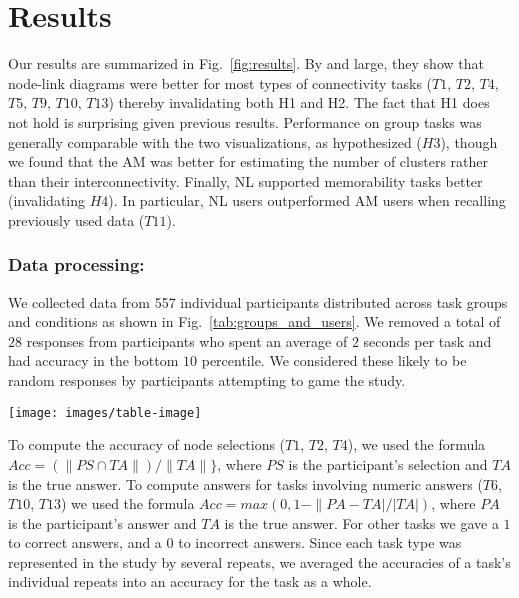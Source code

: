 \section{Results}

Our results are summarized in Fig.~\ref{fig:results}. By and large, they show that node-link diagrams were better for most types of connectivity tasks ($T1$, $T2$, $T4$, $T5$, $T9$, $T10$, $T13$) thereby invalidating both  H1 and H2. The fact that H1 does not hold is surprising given previous results. Performance on group tasks was generally comparable with the two visualizations, as hypothesized ($H3$), though we found that the AM was better for estimating the number of clusters rather than their interconnectivity. Finally, NL supported memorability tasks better (invalidating $H4$). In particular, NL users outperformed AM users when recalling previously used data ($T11$). 

\subsubsection{Data processing:}

We collected data from 557 individual participants distributed across task groups and conditions as shown in Fig.~\ref{tab:groups_and_users}. We removed a total of $28$ responses from participants who spent an average of $2$ seconds per task and had accuracy in the bottom $10$ percentile. We considered these likely to be random responses by participants attempting to game the study.


\begin{figure*}[t]
  \centering
  \texttt{[image: images/table-image]}
  \caption{Number of participants in each task group per condition and the number of valid submissions used after data cleaning.}
	\label{tab:groups_and_users}
\end{figure*}


To compute the accuracy of node selections ($T1$, $T2$, $T4$), we used the formula $Acc = (\|PS \cap TA\|)/\|TA\|\}$, where $PS$ is the participant's selection and $TA$ is the true answer. To compute answers for tasks involving numeric answers ($T6$, $T10$, $T13$) we used the formula $Acc=max(0,1-\|PA-TA|/|TA|)$, where $PA$ is the participant's answer and $TA$ is the true answer. For other tasks we gave a $1$ to correct answers, and a $0$ to incorrect answers. Since each task type was represented in the study by several repeats, we averaged the accuracies of a task's individual repeats into an accuracy for the task as a whole. 

